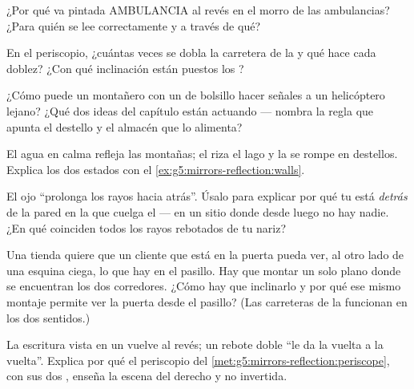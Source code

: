 \begin{exercise}[$\star$]\label{exo:g5:mirrors-reflection:5}
¿Por qué va pintada AMBULANCIA al revés en el morro de las
ambulancias? ¿Para quién se lee correctamente y a través de qué?
\end{exercise}

\begin{exercise}[$\star$]\label{exo:g5:mirrors-reflection:6}
En el periscopio, ¿cuántas veces se dobla la carretera de la  y
qué hace cada doblez? ¿Con qué inclinación están puestos los
?
\end{exercise}

\begin{exercise}[$\star$]\label{exo:g5:mirrors-reflection:7}
¿Cómo puede un montañero con un  de bolsillo hacer señales a
un helicóptero lejano? ¿Qué dos ideas del capítulo están actuando ---
nombra la regla que apunta el destello y el almacén que lo alimenta?
\end{exercise}

\begin{exercise}[$\star$]\label{exo:g5:mirrors-reflection:8}
El agua en calma refleja las montañas; el  riza el lago y la
 se rompe en destellos. Explica los dos estados con el
\cref{ex:g5:mirrors-reflection:walls}.
\end{exercise}

\begin{exercise}[$\star\star$]\label{exo:g5:mirrors-reflection:9}
El ojo ``prolonga los rayos hacia atrás''. Úsalo para explicar por qué
tu  está \emph{detrás} de la pared en la que cuelga el
 --- en un sitio donde desde luego no hay nadie. ¿En qué
coinciden todos los rayos rebotados de tu nariz?
\end{exercise}

\begin{exercise}[$\star\star$]\label{exo:g5:mirrors-reflection:10}
Una tienda quiere que un cliente que está en la puerta pueda ver, al
otro lado de una esquina ciega, lo que hay en el pasillo. Hay que
montar un solo  plano donde se encuentran los dos corredores.
¿Cómo hay que inclinarlo y por qué ese mismo montaje permite ver la
puerta desde el pasillo? (Las carreteras de la  funcionan en los
dos sentidos.)
\end{exercise}

\begin{exercise}[$\star\star$]\label{exo:g5:mirrors-reflection:11}
La escritura vista en un  vuelve al revés; un rebote doble ``le
da la vuelta a la vuelta''. Explica por qué el periscopio del
\cref{met:g5:mirrors-reflection:periscope}, con sus dos ,
enseña la escena del derecho y no invertida.
\end{exercise}
